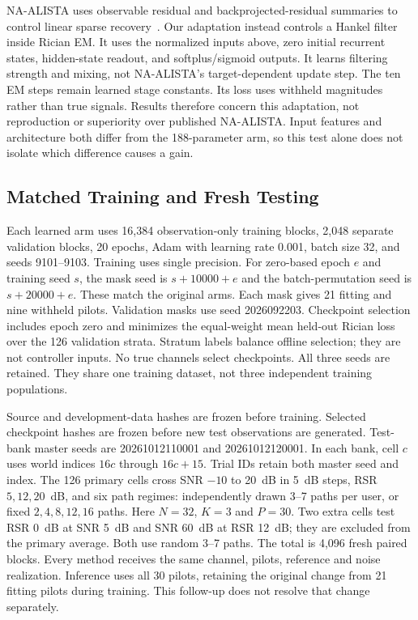 NA-ALISTA uses observable residual and backprojected-residual summaries
to control linear sparse recovery~\cite{behrens2021naalista}. Our adaptation
instead controls a Hankel filter inside Rician EM. It uses the normalized
inputs above, zero initial recurrent states, hidden-state readout, and
softplus/sigmoid outputs. It learns filtering strength and mixing, not
NA-ALISTA's target-dependent update step. The ten EM steps remain learned
stage constants. Its loss uses withheld magnitudes rather than true
signals. Results therefore concern this adaptation, not reproduction or
superiority over published NA-ALISTA. Input features and architecture both
differ from the 188-parameter arm, so this test alone does not isolate
which difference causes a gain.

\subsection{Matched Training and Fresh Testing}
Each learned arm uses 16,384 observation-only training blocks, 2,048
separate validation blocks, 20 epochs, Adam with learning rate 0.001,
batch size 32, and seeds 9101--9103. Training uses single precision.
For zero-based epoch $e$ and training seed $s$, the mask seed is
$s+10000+e$ and the batch-permutation seed is $s+20000+e$. These match
the original arms. Each mask gives 21 fitting and nine withheld pilots.
Validation masks use seed 2026092203. Checkpoint selection includes epoch
zero and minimizes the equal-weight mean held-out Rician loss over the
126 validation strata. Stratum labels balance offline selection; they
are not controller inputs. No true channels select checkpoints. All
three seeds are retained. They share one training dataset, not three
independent training populations.

Source and development-data hashes are frozen before training. Selected
checkpoint hashes are frozen before new test observations are generated.
Test-bank master seeds are 20261012110001 and 20261012120001. In each bank,
cell $c$ uses world indices $16c$ through $16c+15$. Trial IDs retain both
master seed and index. The 126 primary cells cross SNR $-10$ to 20~dB in
5~dB steps, RSR $5,12,20$~dB, and six path regimes: independently drawn
3--7 paths per user, or fixed $2,4,8,12,16$ paths. Here $N=32$, $K=3$ and
$P=30$. Two extra cells test RSR 0~dB at SNR 5~dB and SNR 60~dB at RSR
12~dB; they are excluded from the primary average. Both use random 3--7
paths. The total is 4,096 fresh paired blocks. Every method receives the
same channel, pilots, reference and noise realization. Inference uses
all 30 pilots, retaining the original change from 21 fitting pilots
during training. This follow-up does not resolve that change separately.

